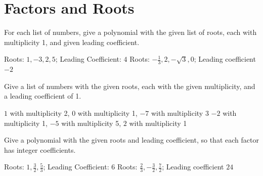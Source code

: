 \section*{Factors and Roots}
For each list of numbers, give a polynomial with the given list of roots, each with multiplicity 1, and given leading coefficient.
\begin{smenum}
\mitemxx
{Roots: $1,-3,2,5$; Leading Coefficient: $4$}
{Roots: $-\frac{1}{3},2,-\sqrt{3},0$; Leading coefficient $-2$}
\end{smenum}
Give a list of numbers with the given roots, each with the given multiplicity, and a leading coefficient of 1.
\begin{smenum}
\mitemxx
{$1$ with multiplicity 2, $0$ with multiplicity 1, $-7$ with multiplicity 3}
{$-2$ with multiplicity 1, $-5$ with multiplicity 5, $2$ with multiplicity 1}
\end{smenum}
Give a polynomial with the given roots and leading coefficient, so that each factor has integer coefficients.
\begin{smenum}
\mitemxx
{Roots: $1,\frac{3}{2},\frac{5}{3}$; Leading Coefficient: $6$}
{Roots: $\frac{2}{3},-\frac{3}{2},\frac{7}{2}$; Leading coefficient $24$}
\end{smenum}

